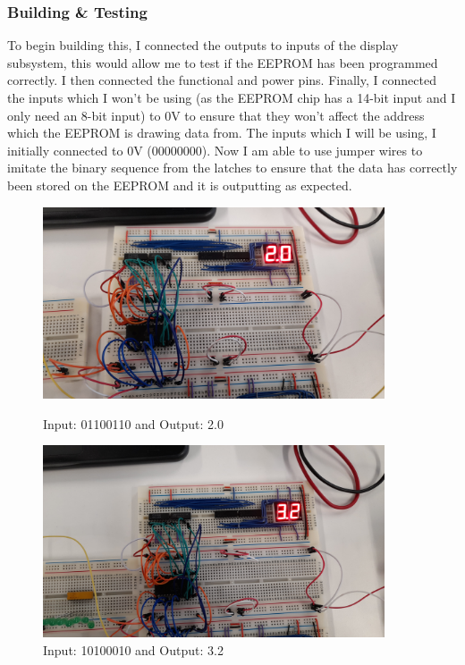 \subsubsection{Building \& Testing}
To begin building this, I connected the outputs to inputs of the display subsystem, this would allow me to test if the EEPROM has been programmed correctly. I then connected the functional and power pins. Finally, I connected the inputs which I won't be using (as the EEPROM chip has a 14-bit input and I only need an 8-bit input) to 0V to ensure that they won't affect the address which the EEPROM is drawing data from. The inputs which I will be using, I initially connected to 0V (00000000). Now I am able to use jumper wires to imitate the binary sequence from the latches to ensure that the data has correctly been stored on the EEPROM and it is outputting as expected.
\begin{figure} [H]
    \centering
    \begin{minipage}[t]{0.45\textwidth}
        \centering
        \includegraphics[width=0.9\textwidth]{images/eepromTesting1.jpg}
        \caption{Input: 01100110 and Output: 2.0}
        \label{fig:eepromTesting1}
    \end{minipage}\hfill
    \begin{minipage}[t] {0.45\textwidth}
        \centering
        \includegraphics[width=0.9\textwidth]{images/eepromTesting2.jpg}
        \caption{Input: 10100010 and Output: 3.2}
         \label{fig:eepromTesting2}
    \end{minipage}
\end{figure}
